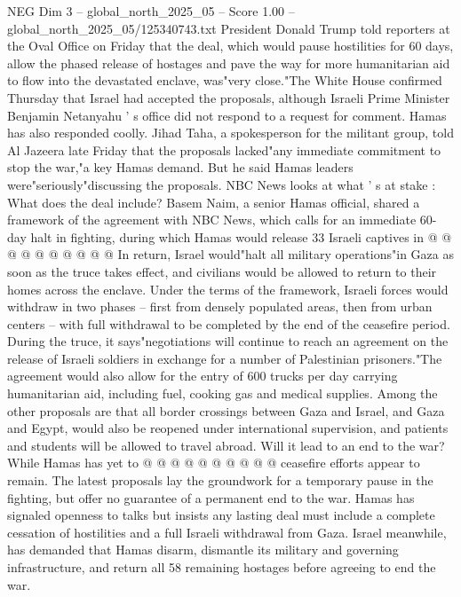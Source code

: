 \begin{textsample}{NEG Dim 3 – global\_north\_2025\_05 – Score 1.00 – global\_north\_2025\_05/125340743.txt}  \label{ex:f3_neg_330}
President Donald Trump told reporters at the Oval Office on Friday that the deal, which would pause hostilities for 60 days, allow the phased release of hostages and pave the way for more humanitarian aid to flow into the devastated enclave, was"very close."The White House confirmed Thursday that Israel had accepted the proposals, although Israeli Prime Minister Benjamin Netanyahu ' s office did not respond to a request for comment.
Hamas has also responded coolly.
Jihad Taha, a spokesperson for the militant group, told Al Jazeera late Friday that the proposals lacked"any immediate commitment to stop the war,"a key Hamas demand.
But he said Hamas leaders were"seriously"discussing the proposals.
NBC News looks at what ' s at stake : What does the deal include?
Basem Naim, a senior Hamas official, shared a framework of the agreement with NBC News, which calls for an immediate 60-day halt in fighting, during which Hamas would release 33 Israeli captives in @ @ @ @ @ @ @ @ @ @ In return, Israel would"halt all military operations"in Gaza as soon as the truce takes effect, and civilians would be allowed to return to their homes across the enclave.
Under the terms of the framework, Israeli forces would withdraw in two phases -- first from densely populated areas, then from urban centers -- with full withdrawal to be completed by the end of the ceasefire period.
During the truce, it says"negotiations will continue to reach an agreement on the release of Israeli soldiers in exchange for a number of Palestinian prisoners."The agreement would also allow for the entry of 600 trucks per day carrying humanitarian aid, including fuel, cooking gas and medical supplies.
Among the other proposals are that all border crossings between Gaza and Israel, and Gaza and Egypt, would also be reopened under international supervision, and patients and students will be allowed to travel abroad.
Will it lead to an end to the war?
While Hamas has yet to @ @ @ @ @ @ @ @ @ @ ceasefire efforts appear to remain.
The latest proposals lay the groundwork for a temporary pause in the fighting, but offer no guarantee of a permanent end to the war.
Hamas has signaled openness to talks but insists any lasting deal must include a complete cessation of hostilities and a full Israeli withdrawal from Gaza.
Israel meanwhile, has demanded that Hamas disarm, dismantle its military and governing infrastructure, and return all 58 remaining hostages before agreeing to end the war.

\end{textsample}
